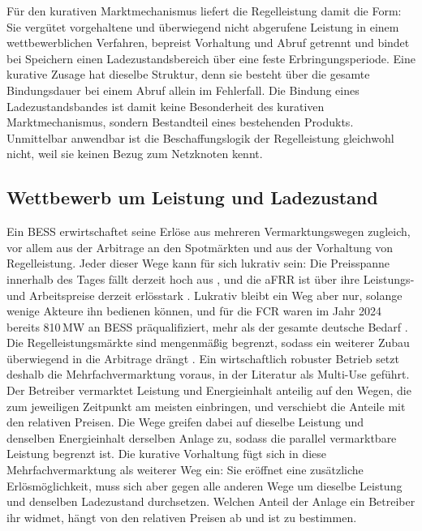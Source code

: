 Für den kurativen Marktmechanismus liefert die Regelleistung damit die Form: Sie vergütet vorgehaltene und überwiegend nicht abgerufene Leistung in einem wettbewerblichen Verfahren, bepreist Vorhaltung und Abruf getrennt und bindet bei Speichern einen Ladezustandsbereich über eine feste Erbringungsperiode.
Eine kurative Zusage hat dieselbe Struktur, denn sie besteht über die gesamte Bindungsdauer bei einem Abruf allein im Fehlerfall.
Die Bindung eines Ladezustandsbandes ist damit keine Besonderheit des kurativen Marktmechanismus, sondern Bestandteil eines bestehenden Produkts.
Unmittelbar anwendbar ist die Beschaffungslogik der Regelleistung gleichwohl nicht, weil sie keinen Bezug zum Netzknoten kennt.

\subsection{Wettbewerb um Leistung und Ladezustand}
\label{sec:revenue_stacking}
\label{sec:soc_conflict}
\label{sec:market_development}

Ein \ac{BESS} erwirtschaftet seine Erlöse aus mehreren Vermarktungswegen zugleich, vor allem aus der Arbitrage an den Spotmärkten und aus der Vorhaltung von Regelleistung.
Jeder dieser Wege kann für sich lukrativ sein: Die Preisspanne innerhalb des Tages fällt derzeit hoch aus \cite{mahgoub_wie_2025}, und die \ac{aFRR} ist über ihre Leistungs- und Arbeitspreise derzeit erlösstark \cite{regelleistung_ausschreibungsdaten_2026}.
Lukrativ bleibt ein Weg aber nur, solange wenige Akteure ihn bedienen können, und für die \ac{FCR} waren im Jahr 2024 bereits 810\,\si{MW} an \ac{BESS} präqualifiziert, mehr als der gesamte deutsche Bedarf \cite{celi_cortes_m5use_2024}.
Die Regelleistungsmärkte sind mengenmäßig begrenzt, sodass ein weiterer Zubau überwiegend in die Arbitrage drängt \cite{garttan_battery_2025}.
Ein wirtschaftlich robuster Betrieb setzt deshalb die Mehrfachvermarktung voraus, in der Literatur als Multi-Use geführt.
Der Betreiber vermarktet Leistung und Energieinhalt anteilig auf den Wegen, die zum jeweiligen Zeitpunkt am meisten einbringen, und verschiebt die Anteile mit den relativen Preisen.
Die Wege greifen dabei auf dieselbe Leistung und denselben Energieinhalt derselben Anlage zu, sodass die parallel vermarktbare Leistung begrenzt ist.
Die kurative Vorhaltung fügt sich in diese Mehrfachvermarktung als weiterer Weg ein: Sie eröffnet eine zusätzliche Erlösmöglichkeit, muss sich aber gegen alle anderen Wege um dieselbe Leistung und denselben Ladezustand durchsetzen.
Welchen Anteil der Anlage ein Betreiber ihr widmet, hängt von den relativen Preisen ab und ist zu bestimmen.

